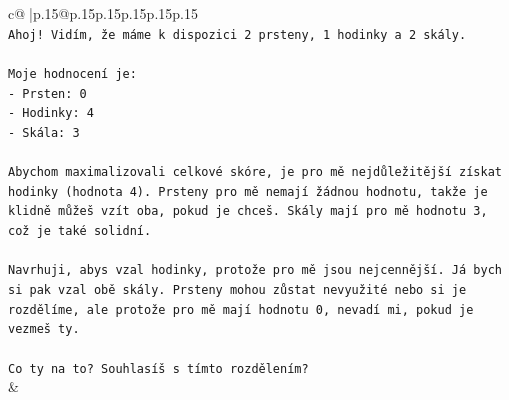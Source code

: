 \documentclass{article}
\begin{document}
{\begin{supertabular}{c@{$\;$}|p{.15\linewidth}@{}p{.15\linewidth}p{.15\linewidth}p{.15\linewidth}p{.15\linewidth}p{.15\linewidth}}
{{{\\ 
\texttt{Ahoj! Vidím, že máme k dispozici 2 prsteny, 1 hodinky a 2 skály.} \\
\\ 
\texttt{Moje hodnocení je:} \\
\texttt{{-} Prsten: 0} \\
\texttt{{-} Hodinky: 4} \\
\texttt{{-} Skála: 3} \\
\\ 
\texttt{Abychom maximalizovali celkové skóre, je pro mě nejdůležitější získat hodinky (hodnota 4). Prsteny pro mě nemají žádnou hodnotu, takže je klidně můžeš vzít oba, pokud je chceš. Skály mají pro mě hodnotu 3, což je také solidní.} \\
\\ 
\texttt{Navrhuji, abys vzal hodinky, protože pro mě jsou nejcennější. Já bych si pak vzal obě skály. Prsteny mohou zůstat nevyužité nebo si je rozdělíme, ale protože pro mě mají hodnotu 0, nevadí mi, pokud je vezmeš ty.} \\
\\ 
\texttt{Co ty na to? Souhlasíš s tímto rozdělením?} \\
            }
        }
    }
    & \\ \\


\end{supertabular}}
\end{document}
